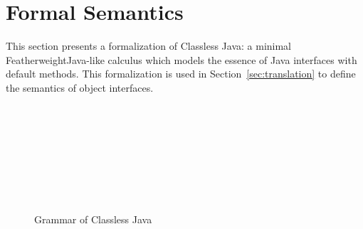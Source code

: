 


\section{Formal Semantics}\label{sec:formal}

This section presents a formalization of Classless Java: a minimal
FeatherweightJava-like calculus which models the essence of Java
interfaces with default methods. This formalization is used in
Section~\ref{sec:translation} to define the semantics of object interfaces.


\begin{figure}[t]
\saveSpaceFig
\begin{grammar}
\\
\\
\\
\\
\\
\\
\\
\end{grammar}
\caption{Grammar of Classless Java}
\label{Grammar}
\end{figure}

